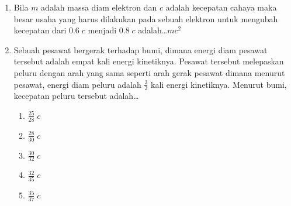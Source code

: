\documentclass[A4,12PT, english, twocolumn]{journal}
\begin{document}
\begin{enumerate}
\item Bila $m$ adalah massa diam elektron dan $c$ adalah kecepatan cahaya maka besar usaha yang harus dilakukan pada sebuah elektron untuk mengubah kecepatan dari $0.6 \; c$ menjadi $0.8 \; c$ adalah\dots$mc^2$
    \begin{enumerate}
        \item $\frac{2}{9}$
        \item $\frac{3}{10}$
        \item $\frac{4}11}$
        \item $\frac{5}{12}$
        \item $\frac{6}{13}$
    \end{enumerate}

\item Sebuah pesawat bergerak terhadap bumi, dimana energi diam pesawat tersebut adalah empat kali energi kinetiknya. Pesawat tersebut melepaskan peluru dengan arah yang sama seperti arah gerak pesawat dimana menurut pesawat, energi diam peluru adalah $\frac{3}{2}$ kali energi kinetiknya. Menurut bumi, kecepatan peluru tersebut adalah\dots
    \begin{enumerate}
        \item $\frac{25}{28} \; c$
        \item $\frac{28}{30} \; c$
        \item $\frac{30}{32} \; c$
        \item $\frac{32}{35} \; c$
        \item $\frac{35}{37} \; c$
    \end{enumerate}

\end{enumerate}
\end{document}
